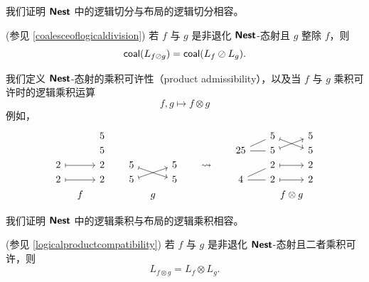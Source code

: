 我们证明 ${\boldsymbol{\mathsf{Nest}}}$ 中的逻辑切分与布局的逻辑切分相容。
\begin{mainthm}(参见 \ref{coalesceoflogicaldivision}) 若 $f$ 与 $g$ 是非退化 ${\boldsymbol{\mathsf{Nest}}}$-态射且 $g$ 整除 $f$，则
\[
\mathsf{coal}(L_{f \oslash g}) = \mathsf{coal}(L_f \oslash L_g).
\]
\end{mainthm}

我们定义 ${\boldsymbol{\mathsf{Nest}}}$-态射的乘积可许性（product admissibility），以及当 $f$ 与 $g$ 乘积可许时的逻辑乘积运算
\[
f,g \mapsto f \otimes g
\]
例如，
\[\begin{tikzcd}[row sep = 1, column sep = 8]
  & & 5 & &   & &  & &  & & & & 5 \ar[drr,mapsto] & & 5\\
  & & 5 & &   & & & & & & 25 \ar[rr,-] \ar[urr,-] & & 5 \ar[urr,mapsto] & & 5\\
2  \ar[rr,mapsto] & & 2 & & 5  \ar[drr,mapsto] & & 5 & & \rightsquigarrow & & &  & 2 \ar[rr,mapsto] & & 2\\
2 \ar[rr,mapsto] & & 2 & & 5 \ar[urr,mapsto]  & & 5 & & & & 4 \ar[rr,-] \ar[urr,-] & & 2 \ar[rr,mapsto] & & 2\\
  & f & & &  & g & & & & & & & & \mathclap{f \otimes g} & 
\end{tikzcd}\] 


我们证明 ${\boldsymbol{\mathsf{Nest}}}$ 中的逻辑乘积与布局的逻辑乘积相容。
\begin{mainthm}(参见 \ref{logicalproductcompatibility}) 若 $f$ 与 $g$ 是非退化 ${\boldsymbol{\mathsf{Nest}}}$-态射且二者乘积可许，则
\[
L_{f \otimes g} = L_f \otimes L_g.
\]
\end{mainthm}

